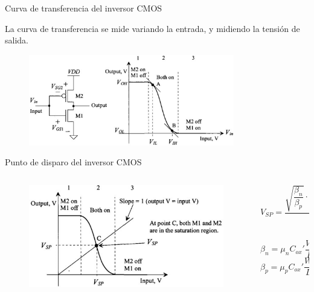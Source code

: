 \documentclass[aspectratio=169,t]{beamer}
\begin{document}
\begin{frame}{Curva de transferencia del inversor CMOS}

La curva de transferencia se mide variando la entrada, y midiendo la tensión de salida.

\begin{figure}
    \centering
    \includegraphics[width=0.8\textwidth]{figuras/inverter_transfer_1.png}
\end{figure}



\end{frame}


\begin{frame}{Punto de disparo del inversor CMOS}

\begin{columns}

\begin{column}{0.5\textwidth}

\begin{figure}
    \centering
    \includegraphics[width=\textwidth]{figuras/inverter_transfer_2.png}
\end{figure}

\end{column}

\begin{column}{0.5\textwidth}

\[ V_{SP} = \dfrac{\sqrt{\dfrac{\beta_n}{\beta_p}} \cdot V_{THn} + (V_{DD} - V_{THp})}{1 + \sqrt{\dfrac{\beta_n}{\beta_p}}} \]
\[ \beta_n = \mu_n C_{ox}' \dfrac{W}{L} \]
\[ \beta_p = \mu_p C_{ox}' \dfrac{W}{L} \]

\end{column}

\end{columns}

\end{frame}
\end{document}
